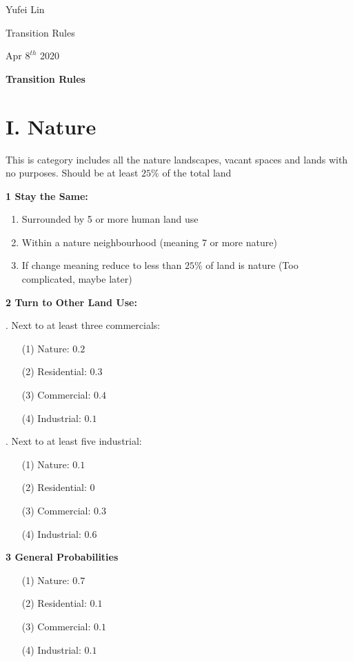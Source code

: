 \documentclass[a4paper,12pt]{report}
\begin{document}
\noindent
Yufei Lin

\noindent
Transition Rules

\noindent
Apr \(8^{th}\) 2020

\begin{center}
\textbf{Transition Rules}
\end{center}

\section*{I. Nature}
This is category includes all the nature landscapes, vacant spaces and lands with no purposes. Should be at least $25\%$ of the total land

\noindent
\textbf{1 Stay the Same: }

\begin{enumerate}
\item Surrounded by 5 or more human land use
\item Within a nature neighbourhood (meaning 7 or more nature)
\item If change meaning reduce to less than $25\%$ of land is nature (Too complicated, maybe later)
\end{enumerate}

\noindent
\textbf{2 Turn to Other Land Use:}

. Next to at least three commercials:
\begin{enumerate}
\item[(1)] Nature: $0.2$ 
\item[(2)] Residential: $0.3$
\item[(3)] Commercial: $0.4$
\item[(4)] Industrial: $0.1$
\end{enumerate}

. Next to at least five industrial:
\begin{enumerate}
\item[(1)] Nature: $0.1$ 
\item[(2)] Residential: $0$
\item[(3)] Commercial: $0.3$
\item[(4)] Industrial: $0.6$
\end{enumerate}

\noindent
\textbf{3 General Probabilities}
\begin{enumerate}
\item[(1)] Nature: $0.7$ 
\item[(2)] Residential: $0.1$
\item[(3)] Commercial: $0.1$
\item[(4)] Industrial: $0.1$
\end{enumerate}
\end{document}
